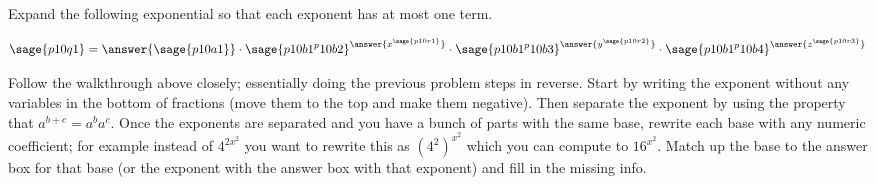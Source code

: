 \documentclass{ximera}
\begin{document}
\begin{problem}
    Expand the following exponential so that each exponent has at most one term.
    
    \[
        \sage{p10q1} 
            = \answer{\sage{p10a1}} \cdot {\sage{p10b1^p10b2}}^{\answer{x^{\sage{p10r1}}}} \cdot  {\sage{p10b1^p10b3}}^{\answer{y^{\sage{p10r2}}}} \cdot {\sage{p10b1^p10b4}}^{\answer{z^{\sage{p10r3}}}}
    \]
    \begin{feedback}
        Follow the walkthrough above closely; essentially doing the previous problem steps in reverse. Start by writing the exponent without any variables in the bottom of fractions (move them to the top and make them negative). Then separate the exponent by using the property that $a^{b+c} = a^ba^c$. Once the exponents are separated and you have a bunch of parts with the same base, rewrite each base with any numeric coefficient; for example instead of $4^{2x^2}$ you want to rewrite this as $\left(4^2\right)^{x^2}$ which you can compute to $16^{x^2}$. Match up the base to the answer box for that base (or the exponent with the answer box with that exponent) and fill in the missing info.
    \end{feedback}
\end{problem}
\end{document}
